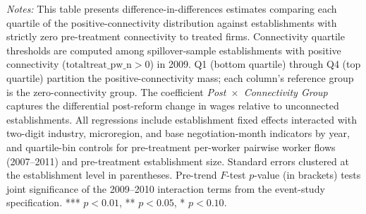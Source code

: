 \begin{table}[H]
\begin{minipage}{\linewidth}
\textit{Notes:} This table presents difference-in-differences estimates comparing each quartile of the positive-connectivity distribution against establishments with strictly zero pre-treatment connectivity to treated firms. Connectivity quartile thresholds are computed among spillover-sample establishments with positive connectivity ($\text{totaltreat\_pw\_n} > 0$) in 2009. Q1 (bottom quartile) through Q4 (top quartile) partition the positive-connectivity mass; each column's reference group is the zero-connectivity group. The coefficient \textit{Post~$\times$~Connectivity Group} captures the differential post-reform change in wages relative to unconnected establishments. All regressions include establishment fixed effects interacted with two-digit industry, microregion, and base negotiation-month indicators by year, and quartile-bin controls for pre-treatment per-worker pairwise worker flows (2007--2011) and pre-treatment establishment size. Standard errors clustered at the establishment level in parentheses. Pre-trend $F$-test $p$-value (in brackets) tests joint significance of the 2009--2010 interaction terms from the event-study specification. *** $p<0.01$, ** $p<0.05$, * $p<0.10$.
\end{minipage}
\end{table}
